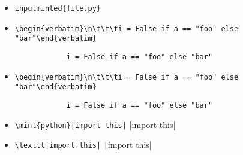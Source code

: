 \documentclass[a4paper]{article}
\begin{document}
\begin{itemize}
	\item \verb|inputminted{file.py}|
	\item \verb|\begin{verbatim}\n\t\t\ti = False if a == "foo" else "bar"\end{verbatim}|
		\begin{verbatim}
			i = False if a == "foo" else "bar"
		\end{verbatim}
	\item \verb|\begin{verbatim}\n\t\t\ti = False if a == "foo" else "bar"\end{verbatim}|
			\begin{verbatim}
			i = False if a == "foo" else "bar"
		\end{verbatim}
	\item \verb+\mint{python}|import this|+ |import this|
	\item \verb+\texttt|import this|+ \quad \texttt|import this|
\end{itemize}
\end{document}
